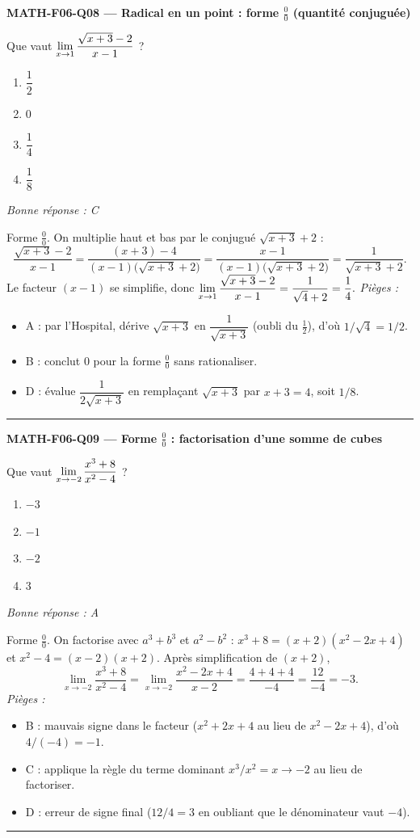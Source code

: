 \documentclass[11pt,a4paper]{article}
\begin{document}
\noindent\textbf{MATH-F06-Q08 --- Radical en un point : forme $\frac00$ (quantité conjuguée)}\par
Que vaut $\displaystyle\lim_{x\to 1}\frac{\sqrt{x+3}-2}{x-1}$ ?
\begin{enumerate}[label=\Alph*)]
\item $\dfrac{1}{2}$
\item $0$
\item $\dfrac{1}{4}$
\item $\dfrac{1}{8}$
\end{enumerate}
\textit{Bonne réponse : C}\par
Forme $\frac00$. On multiplie haut et bas par le conjugué $\sqrt{x+3}+2$ :
\[ \frac{\sqrt{x+3}-2}{x-1}=\frac{(x+3)-4}{(x-1)\bigl(\sqrt{x+3}+2\bigr)}=\frac{x-1}{(x-1)\bigl(\sqrt{x+3}+2\bigr)}=\frac{1}{\sqrt{x+3}+2}. \]
Le facteur $(x-1)$ se simplifie, donc
$\displaystyle\lim_{x\to 1}\frac{\sqrt{x+3}-2}{x-1}=\frac{1}{\sqrt{4}+2}=\frac{1}{4}.$
\textit{Pièges :}
\begin{itemize}
\item A : par l'Hospital, dérive $\sqrt{x+3}$ en $\dfrac{1}{\sqrt{x+3}}$ (oubli du $\frac12$), d'où $1/\sqrt{4}=1/2$.
\item B : conclut $0$ pour la forme $\frac00$ sans rationaliser.
\item D : évalue $\dfrac{1}{2\sqrt{x+3}}$ en remplaçant $\sqrt{x+3}$ par $x+3=4$, soit $1/8$.
\end{itemize}
\vspace{8pt}\hrule\vspace{8pt}

\noindent\textbf{MATH-F06-Q09 --- Forme $\frac00$ : factorisation d'une somme de cubes}\par
Que vaut $\displaystyle\lim_{x\to -2}\frac{x^{3}+8}{x^{2}-4}$ ?
\begin{enumerate}[label=\Alph*)]
\item $-3$
\item $-1$
\item $-2$
\item $3$
\end{enumerate}
\textit{Bonne réponse : A}\par
Forme $\frac00$. On factorise avec $a^{3}+b^{3}$ et $a^{2}-b^{2}$ :
$x^{3}+8=(x+2)(x^{2}-2x+4)$ et $x^{2}-4=(x-2)(x+2)$. Après simplification de $(x+2)$,
\[ \lim_{x\to -2}\frac{x^{3}+8}{x^{2}-4}=\lim_{x\to -2}\frac{x^{2}-2x+4}{x-2}=\frac{4+4+4}{-4}=\frac{12}{-4}=-3. \]
\textit{Pièges :}
\begin{itemize}
\item B : mauvais signe dans le facteur ($x^{2}+2x+4$ au lieu de $x^{2}-2x+4$), d'où $4/(-4)=-1$.
\item C : applique la règle du terme dominant $x^{3}/x^{2}=x\to -2$ au lieu de factoriser.
\item D : erreur de signe final ($12/4=3$ en oubliant que le dénominateur vaut $-4$).
\end{itemize}
\vspace{8pt}\hrule\vspace{8pt}
\end{document}
